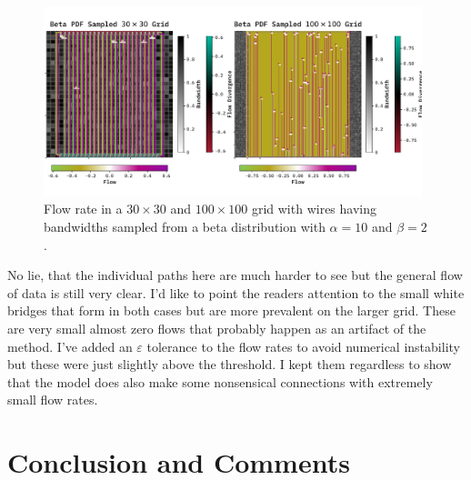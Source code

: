 \documentclass[10pt, titlepage, a4paper]{article}
\begin{document}
\begin{figure}[H]
    \centering
    \includegraphics[width=0.98\textwidth]{../Images/optimize-30-100.pdf}
    \caption{Flow rate in a $30\times 30$ and $100\times 100$ grid with wires having bandwidths sampled from a beta distribution with $\alpha = 10$ and $\beta = 2$.}
    \label{fig:opt-30-100}  
\end{figure}

No lie, that the individual paths here are much harder to see but the general flow of data is still very clear. I'd like to 
point the readers attention to the small white bridges that form in both cases but are more prevalent on the larger grid. These are 
very small almost zero flows that probably happen as an artifact of the method. I've added an $\varepsilon$ tolerance 
to the flow rates to avoid numerical instability but these were just slightly above the threshold. I kept them regardless to 
show that the model does also make some nonsensical connections with extremely small flow rates. \\


\section{Conclusion and Comments}

% 
% 

\end{document}
